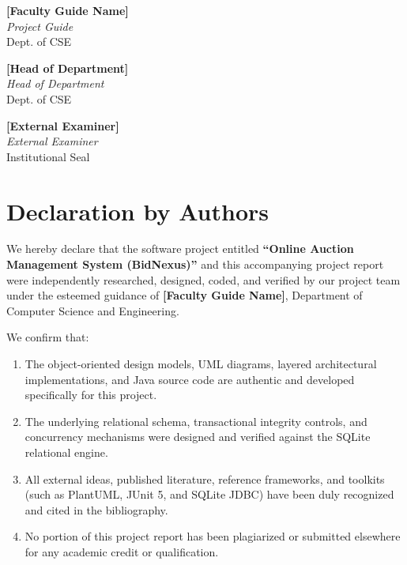 \documentclass[12pt,a4paper]{article}
\begin{document}
\vspace{3cm}

\noindent
\begin{minipage}[t]{0.32\textwidth}
\centering
\textbf{[Faculty Guide Name]}\\
\textit{Project Guide}\\
Dept. of CSE
\end{minipage}
\hfill
\begin{minipage}[t]{0.32\textwidth}
\centering
\textbf{[Head of Department]}\\
\textit{Head of Department}\\
Dept. of CSE
\end{minipage}
\hfill
\begin{minipage}[t]{0.32\textwidth}
\centering
\textbf{[External Examiner]}\\
\textit{External Examiner}\\
Institutional Seal
\end{minipage}

\newpage

\section*{Declaration by Authors}
\vspace{1cm}

We hereby declare that the software project entitled \textbf{``Online Auction Management System (BidNexus)''} and this accompanying project report were independently researched, designed, coded, and verified by our project team under the esteemed guidance of \textbf{[Faculty Guide Name]}, Department of Computer Science and Engineering.

We confirm that:
\begin{enumerate}[label=(\alph*)]
    \item The object-oriented design models, UML diagrams, layered architectural implementations, and Java source code are authentic and developed specifically for this project.
    \item The underlying relational schema, transactional integrity controls, and concurrency mechanisms were designed and verified against the SQLite relational engine.
    \item All external ideas, published literature, reference frameworks, and toolkits (such as PlantUML, JUnit 5, and SQLite JDBC) have been duly recognized and cited in the bibliography.
    \item No portion of this project report has been plagiarized or submitted elsewhere for any academic credit or qualification.
\end{enumerate}
\end{document}
